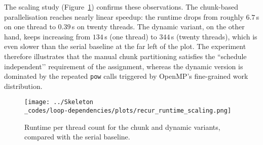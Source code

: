 

The scaling study (Figure~\ref{fig:recur_scaling}) confirms these observations.  The chunk-based
parallelisation reaches nearly linear speedup: the runtime drops from roughly $6.7\,$s on one
thread to $0.39\,$s on twenty threads.  The dynamic variant, on the other hand, keeps increasing
from $134\,$s (one thread) to $344\,$s (twenty threads), which is even slower than the serial
baseline at the far left of the plot.  The experiment therefore illustrates that the manual chunk
partitioning satisfies the “schedule independent’’ requirement of the assignment, whereas the
dynamic version is dominated by the repeated \texttt{pow} calls triggered by OpenMP’s fine-grained
work distribution.

\begin{figure}[H]
    \centering
    \texttt{[image: ../Skeleton\\\_codes/loop-dependencies/plots/recur\_runtime\_scaling.png]}
    \caption{Runtime per thread count for the chunk and dynamic variants, compared with the serial baseline.}
    \label{fig:recur_scaling}
\end{figure}
